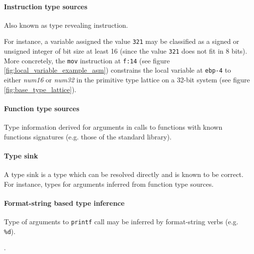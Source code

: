
\paragraph{Instruction type sources}

Also known as type revealing instruction.

For instance, a variable assigned the value \texttt{321} may be classified as a signed or unsigned integer of bit size at least 16 (since the value \texttt{321} does not fit in 8 bits). More concretely, the \texttt{mov} instruction at \texttt{f:14} (see figure \ref{fig:local_variable_example_asm}) constrains the local variable at \texttt{ebp-4} to either \textit{num16} or \textit{num32} in the primitive type lattice on a 32-bit system (see figure \ref{fig:base_type_lattice}).




\paragraph{Function type sources}

Type information derived for arguments in calls to functions with known functions signatures (e.g. those of the standard library). \cite{type_inference_on_executables}


\paragraph{Type sink}

A type sink is a type which can be resolved directly and is known to be correct. For instance, types for arguments inferred from function type sources.


\paragraph{Format-string based type inference}


Type of arguments to \texttt{printf} call may be inferred by format-string verbs (e.g. \texttt{\%d}).

.
